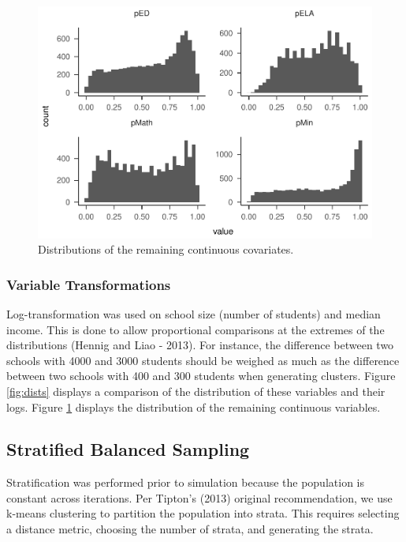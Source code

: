 \documentclass[,man]{apa6}
\theoremstyle{definition}
\theoremstyle{definition}
\theoremstyle{definition}
\theoremstyle{remark}
\begin{document}
\begin{figure}
\centering
\includegraphics{Method_files/figure-latex/dists2-1.pdf}
\caption{\label{fig:dists2}Distributions of the remaining continuous
covariates.}
\end{figure}

\hypertarget{variable-transformations}{%
\subsubsection{Variable
Transformations}\label{variable-transformations}}

Log-transformation was used on school size (number of students) and
median income. This is done to allow proportional comparisons at the
extremes of the distributions (Hennig and Liao - 2013). For instance,
the difference between two schools with 4000 and 3000 students should be
weighed as much as the difference between two schools with 400 and 300
students when generating clusters. Figure \ref{fig:dists} displays a
comparison of the distribution of these variables and their logs. Figure
\ref{fig:dists2} displays the distribution of the remaining continuous
variables.

\hypertarget{stratified-balanced-sampling}{%
\subsection{Stratified Balanced
Sampling}\label{stratified-balanced-sampling}}

Stratification was performed prior to simulation because the population
is constant across iterations. Per Tipton's (2013) original
recommendation, we use k-means clustering to partition the population
into strata. This requires selecting a distance metric, choosing the
number of strata, and generating the strata.
\end{document}
